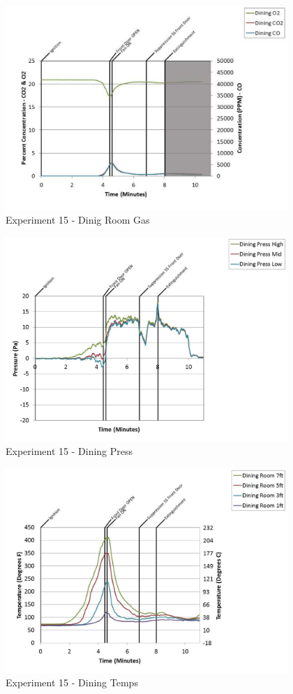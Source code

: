 \documentclass{article}
\begin{document}
\begin{appendices}
	\clearpage

	\begin{figure}[h!]
		\centering
		\includegraphics[height=3.05in]{0_Images/Results_Charts/Exp_15_Charts/DinigRoomGas.pdf}
		\caption{Experiment 15 - Dinig Room Gas}
	\end{figure}
 

	\begin{figure}[h!]
		\centering
		\includegraphics[height=3.05in]{0_Images/Results_Charts/Exp_15_Charts/DiningPress.pdf}
		\caption{Experiment 15 - Dining Press}
	\end{figure}
 
	\clearpage

	\begin{figure}[h!]
		\centering
		\includegraphics[height=3.05in]{0_Images/Results_Charts/Exp_15_Charts/DiningTemps.pdf}
		\caption{Experiment 15 - Dining Temps}
	\end{figure}
 


\end{appendices}
\end{document}
